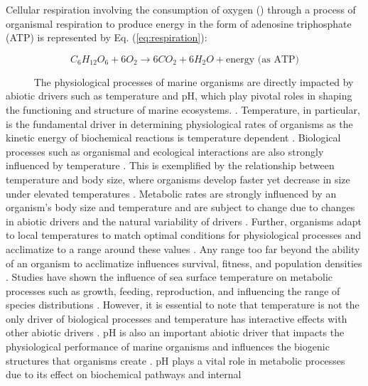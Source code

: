\documentclass[
  12pt,
]{article}
\begin{document}
Cellular respiration involving the consumption of oxygen ()
through a process of organismal respiration to produce energy in the
form of adenosine triphosphate (ATP) \cite{babcock1992oxygen} is
represented by Eq. (\ref{eq:respiration}):

\begin{equation}\label{eq:respiration}
    C_6H_{12}O_6 + 6O_2 \rightarrow 6CO_2 + 6H_2O + \text{energy (as ATP)}
\end{equation}

~~~~~ The physiological processes of marine organisms are directly
impacted by abiotic drivers such as temperature and pH, which play
pivotal roles in shaping the functioning and structure of marine
ecosystems. \citep{woodwell1970effects}. Temperature, in particular, is
the fundamental driver in determining physiological rates of organisms
as the kinetic energy of biochemical reactions is temperature dependent
\citep{levins1968evolution, somero2002thermal, portner2012integrating}.
Biological processes such as organismal and ecological interactions are
also strongly influenced by temperature
\citep{hochachka2002biochemical}. This is exemplified by the
relationship between temperature and body size, where organisms develop
faster yet decrease in size under elevated temperatures
\citep{elahi2020historical}. Metabolic rates are strongly influenced by
an organism's body size and temperature and are subject to change due to
changes in abiotic drivers and the natural variability of drivers
\citep{brown2004metabolic, oconnor2007temperature}. Further, organisms
adapt to local temperatures to match optimal conditions for
physiological processes and acclimatize to a range around these values
\citep{sinclair2016can}. Any range too far beyond the ability of an
organism to acclimatize influences survival, fitness, and population
densities \citep{hochachka2002biochemical}. Studies have shown the
influence of sea surface temperature on metabolic processes such as
growth, feeding, reproduction, and influencing the range of species
distributions
\citep{kordas2011community, sanford2002feeding, pinsky2013marine}.
However, it is essential to note that temperature is not the only driver
of biological processes and temperature has interactive effects with
other abiotic drivers \citep{darling2008quantifying}. pH is also an
important abiotic driver that impacts the physiological performance of
marine organisms and influences the biogenic structures that organisms
create \citep{hofmann2010living}. pH plays a vital role in metabolic
processes due to its effect on biochemical pathways and internal
\end{document}
